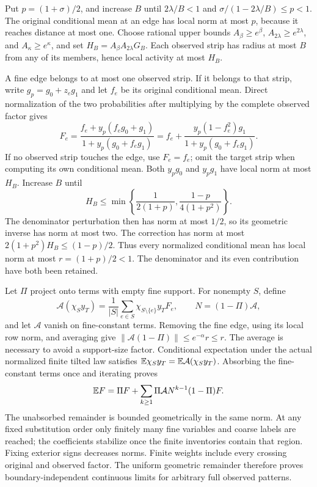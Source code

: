 Put \(p=(1+\sigma)/2\), and increase \(B\) until
\(2\lambda/B<1\) and
\(\sigma/(1-2\lambda/B)\le p<1\). The original conditional mean at an
edge has local norm at most \(p\), because it reaches distance at most one.
Choose rational upper bounds \(A_\beta\ge e^\beta\),
\(A_{2\lambda}\ge e^{2\lambda}\), and
\(A_\kappa\ge e^\kappa\), and set
\(H_B=A_\beta A_{2\lambda}G_B\). Each observed strip has radius at most
\(B\) from any of its members, hence local activity at most \(H_B\).

A fine edge belongs to at most one observed strip. If it belongs to that
strip, write \(g_p=g_0+z_eg_1\) and let \(f_e\) be its original
conditional mean. Direct normalization of the two probabilities after
multiplying by the complete observed factor gives
\begin{equation}
 F_e=\frac{f_e+y_p(f_eg_0+g_1)}{1+y_p(g_0+f_eg_1)}
     =f_e+\frac{y_p(1-f_e^2)g_1}{1+y_p(g_0+f_eg_1)}.
 \label{eq:rg-spatial-proof-normalized-tilted-row}
\end{equation}
If no observed strip touches the edge, use \(F_e=f_e\); omit the target
strip when computing its own conditional mean. Both \(y_pg_0\) and
\(y_pg_1\) have local norm at most \(H_B\). Increase \(B\) until
\begin{equation}
 H_B\le\min\left\{\frac1{2(1+p)},
                       \frac{1-p}{4(1+p^2)}\right\}.
 \label{eq:rg-spatial-proof-basin-row-gate}
\end{equation}
The denominator perturbation then has norm at most \(1/2\), so its
geometric inverse has norm at most two. The correction has norm at most
\(2(1+p^2)H_B\le(1-p)/2\). Thus every normalized conditional mean has
local norm at most \(r=(1+p)/2<1\). The denominator and its even
contribution have both been retained.

Let \(\Pi\) project onto terms with empty fine support. For nonempty
\(S\), define
\begin{equation}
 \mathcal A(\chi_Sy_T)=\frac1{|S|}\sum_{e\in S}
              \chi_{S\setminus\{e\}}y_TF_e,\qquad
 N=(1-\Pi)\mathcal A,
 \label{eq:rg-spatial-proof-absorbing-operator}
\end{equation}
and let \(\mathcal A\) vanish on fine-constant terms. Removing the fine
edge, using its local row norm, and averaging give
\(\|\mathcal A(1-\Pi)\|\le e^{-\alpha}r\le r\). The average is
necessary to avoid a support-size factor. Conditional expectation under
the actual normalized finite tilted law satisfies
\(\mathbb E\chi_Sy_T=\mathbb E\mathcal A(\chi_Sy_T)\). Absorbing the fine-constant
terms once and iterating proves
\begin{equation}
 \mathbb E F=\Pi F+\sum_{k\ge1}\Pi\mathcal A N^{k-1}(1-\Pi)F.
 \label{eq:rg-spatial-proof-absorbing-series}
\end{equation}
The unabsorbed remainder is bounded geometrically in the same norm. At any
fixed substitution order only finitely many fine variables and coarse
labels are reached; the coefficients stabilize once the finite inventories
contain that region. Fixing exterior signs decreases norms. Finite weights
include every crossing original and observed factor. The uniform
geometric remainder therefore proves boundary-independent continuous
limits for arbitrary full observed patterns.

